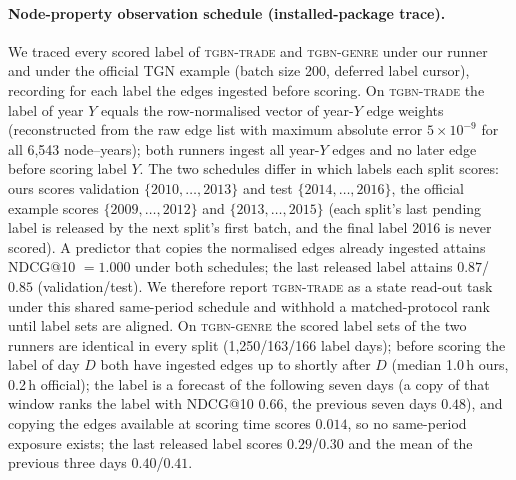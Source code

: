 \paragraph{Node-property observation schedule (installed-package trace).}
We traced every scored label of \textsc{tgbn-trade} and \textsc{tgbn-genre} under our runner and under the
official TGN example (batch size 200, deferred label cursor), recording for each label the edges ingested
before scoring. On \textsc{tgbn-trade} the label of year $Y$ equals the row-normalised vector of year-$Y$
edge weights (reconstructed from the raw edge list with maximum absolute error $5\times10^{-9}$ for all
6{,}543 node--years); both runners ingest all year-$Y$ edges and no later edge before scoring label $Y$.
The two schedules differ in which labels each split scores: ours scores validation $\{2010,\dots,2013\}$ and
test $\{2014,\dots,2016\}$, the official example scores $\{2009,\dots,2012\}$ and $\{2013,\dots,2015\}$
(each split's last pending label is released by the next split's first batch, and the final label 2016 is
never scored). A predictor that copies the normalised edges already ingested attains NDCG@10 $=1.000$ under
both schedules; the last released label attains $0.87$/$0.85$ (validation/test). We therefore report
\textsc{tgbn-trade} as a state read-out task under this shared same-period schedule and withhold a
matched-protocol rank until label sets are aligned. On \textsc{tgbn-genre} the scored label sets of the two
runners are identical in every split (1{,}250/163/166 label days); before scoring the label of day $D$ both
have ingested edges up to shortly after $D$ (median 1.0\,h ours, 0.2\,h official); the label is a forecast of
the following seven days (a copy of that window ranks the label with NDCG@10 $0.66$, the previous seven days
$0.48$), and copying the edges available at scoring time scores $0.014$, so no same-period exposure exists;
the last released label scores $0.29$/$0.30$ and the mean of the previous three days $0.40$/$0.41$.
